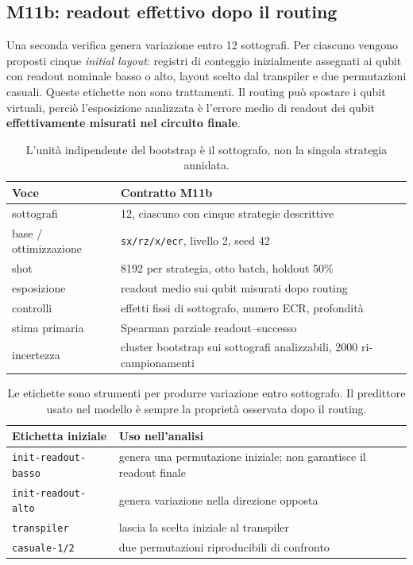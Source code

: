 \begin{onehalfspace}
\section{M11b: readout effettivo dopo il routing}
\label{sec:app_comp_ruoli}

Una seconda verifica genera variazione entro 12 sottografi. Per ciascuno vengono proposti cinque \emph{initial layout}: registri di conteggio inizialmente assegnati ai qubit con readout nominale basso o alto, layout scelto dal transpiler e due permutazioni casuali. Queste etichette non sono trattamenti. Il routing pu\`o spostare i qubit virtuali, perci\`o l'esposizione analizzata \`e l'errore medio di readout dei qubit \textbf{effettivamente misurati nel circuito finale}.

\begin{table}[H]
\centering
\small
\begin{tabular}{p{}p{}}
\toprule
\textbf{Voce} & \textbf{Contratto M11b} \\
\midrule
sottografi & 12, ciascuno con cinque strategie descrittive \\
base / ottimizzazione & \texttt{sx/rz/x/ecr}, livello 2, seed 42 \\
shot & 8192 per strategia, otto batch, holdout 50\% \\
esposizione & readout medio sui qubit misurati dopo routing \\
controlli & effetti fissi di sottografo, numero ECR, profondit\`a \\
stima primaria & Spearman parziale readout--successo \\
incertezza & cluster bootstrap sui sottografi analizzabili, 2000 ri-campionamenti \\
\bottomrule
\end{tabular}
\caption[Disegno osservazionale M11b]{L'unit\`a indipendente del bootstrap \`e il sottografo, non la singola strategia annidata.}
\label{tab:app_comp_ruoli}
\end{table}

\begin{table}[H]
\centering
\small
\begin{tabular}{lp{}}
\toprule
\textbf{Etichetta iniziale} & \textbf{Uso nell'analisi} \\
\midrule
\texttt{init-readout-basso} & genera una permutazione iniziale; non garantisce il readout finale \\
\texttt{init-readout-alto} & genera variazione nella direzione opposta \\
\texttt{transpiler} & lascia la scelta iniziale al transpiler \\
\texttt{casuale-1/2} & due permutazioni riproducibili di confronto \\
\bottomrule
\end{tabular}
\caption[Strategie descrittive di M11b]{Le etichette sono strumenti per produrre variazione entro sottografo. Il predittore usato nel modello \`e sempre la propriet\`a osservata dopo il routing.}
\label{tab:app_comp_strategie}
\end{table}


\end{onehalfspace}
